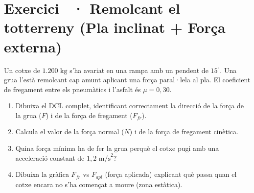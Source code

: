 \documentclass[12pt,a4paper,twoside]{article}
\newcounter{exercici}
\newcommand{\exercici}[1]{%
  \stepcounter{exercici}
  \section*{Exercici \theexercici\ \textnormal{· #1}}
  \vspace{-10pt}
}
\begin{document}
\clearpage
\exercici{Remolcant el totterreny (Pla inclinat + Força externa)}
Un cotxe de $1.200 \text{ kg}$ s'ha avariat en una rampa amb un pendent de $15^\circ$. Una grua l'està remolcant cap amunt aplicant una força paral·lela al pla. El coeficient de fregament entre els pneumàtics i l'asfalt és $\mu = 0{,}30$.
\begin{enumerate}[label=\textbf{\alph*)}]
  \item Dibuixa el DCL complet, identificant correctament la direcció de la força de la grua ($F$) i de la força de fregament ($F_{fr}$).
  \item Calcula el valor de la força normal ($N$) i de la força de fregament cinètica.
  \item Quina força mínima ha de fer la grua perquè el cotxe pugi amb una acceleració constant de $1{,}2 \text{ m/s}^2$?
  \item Dibuixa la gràfica $F_{fr}$ vs $F_{apl}$ (força aplicada) explicant què passa quan el cotxe encara no s'ha començat a moure (zona estàtica).
\end{enumerate}
\end{document}
